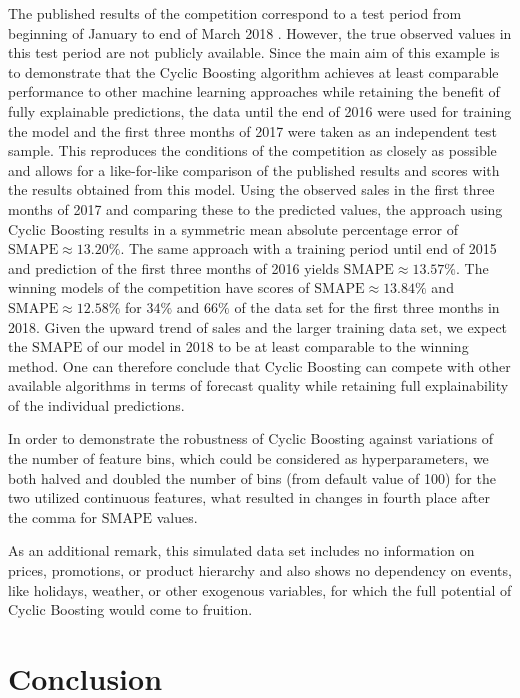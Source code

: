 \documentclass[BCOR=1mm, DIV=calc,10pt,
twoside=true,
twocolumn,
headings=normal]{scrartcl}
\begin{document}
The published results of the competition correspond to a test period from beginning of
January to end of March 2018 \cite{kaggle_data}. However, the true observed values in this
test period are not publicly available. Since the main aim of this example is to
demonstrate that the Cyclic Boosting algorithm achieves at least comparable performance to
other machine learning approaches while retaining the benefit of fully explainable
predictions, the data until the end of 2016 were used for training the model and the first
three months of 2017 were taken as an independent test sample. This reproduces the
conditions of the competition as closely as possible and allows for a like-for-like
comparison of the published results and scores with the results obtained from this model.
Using the observed sales in the first three months of 2017 and comparing these to the
predicted values, the approach using Cyclic Boosting results in a symmetric mean absolute
percentage error of $\mathrm{SMAPE} \approx 13.20\%$. The same approach with a training
period until end of 2015 and prediction of the first three months of 2016 yields
$\mathrm{SMAPE} \approx 13.57\%$. The winning models of the competition have scores of
$\mathrm{SMAPE} \approx 13.84\%$ and $\mathrm{SMAPE} \approx 12.58\%$ for $34\%$ and
$66\%$ of the data set for the first three months in 2018. Given the upward trend of sales
and the larger training data set, we expect the $\mathrm{SMAPE}$ of our model in 2018 to
be at least comparable to the winning method. One can therefore conclude that Cyclic
Boosting can compete with other available algorithms in terms of forecast quality while
retaining full explainability of the individual predictions.

In order to demonstrate the robustness of Cyclic Boosting against variations of the number
of feature bins, which could be considered as hyperparameters, we both halved and doubled
the number of bins (from default value of 100) for the two utilized continuous features,
what resulted in changes in fourth place after the comma for $\mathrm{SMAPE}$ values.

As an additional remark, this simulated data set includes no information on prices,
promotions, or product hierarchy and also shows no dependency on events, like holidays,
weather, or other exogenous variables, for which the full potential of Cyclic Boosting
would come to fruition.


\section{Conclusion}
\end{document}
